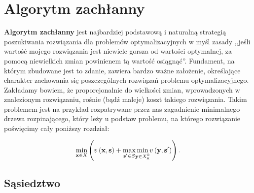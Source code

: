 \section{Algorytm zachłanny}

\textbf{Algorytm zachłanny} jest najbardziej podstawową i naturalną strategią poszukiwania rozwiązania dla problemów optymalizacyjnych w myśl zasady ,,jeśli wartość mojego rozwiązania jest niewiele gorsza od wartości optymalnej, za pomocą niewielkich zmian powinienem tą wartość osiągnąć''. Fundament, na którym zbudowane jest to zdanie, zawiera bardzo ważne założenie, określające charakter zachowania się poszczególnych rozwiązań problemu optymalizacyjnego. Zakładamy bowiem, że proporcjonalnie do wielkości zmian, wprowadzonych w znalezionym rozwiązaniu, rośnie (bądź maleje) koszt takiego rozwiązania. Takim problemem jest na przykład rozpatrywane przez nas zagadnienie minimalnego drzewa rozpinającego, który leży u podstaw problemu, na którego rozwiązanie poświęcimy cały poniższy rozdział:

\begin{equation}\label{eq:rrimst}
\min_{\mathclap{\textbf{x} \in X}} \left( v \left( \textbf{x}, \textbf{s} \right) + \max_{\mathclap{\textbf{s}^{\prime} \in S}} \min_{\mathclap{\textbf{y} \in X^{k}_{\textbf{x}}}} v \left( \textbf{y}, \textbf{s}^{\prime} \right) \right)\text{.}
\end{equation}
\vspace*{-20pt}
\subsection{Sąsiedztwo}

